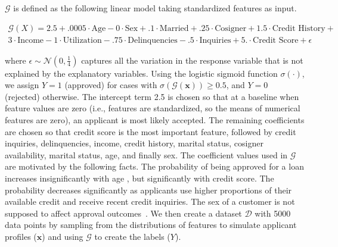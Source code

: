 \documentclass[mnsc,blindrev]{informs3}
\begin{document}
    $\mathcal{G}$ is defined as the following linear model taking standardized features as input. 
    \begin{tcolorbox}%
    \begin{equation}
    \label{eqn:gt}
    \begin{split}
    \mathcal{G}(X) =2.5 +.0005\cdot\text{Age} -0\cdot\text{Sex} +.1 \cdot \text{Married} + .25\cdot \text{Cosigner} + 1.5 \cdot \text{Credit History} + \\   3 \cdot \text{Income} - 1\cdot\text{Utilization} -.75 \cdot \text{Delinquencies} - .5\cdot\text{Inquiries} + 5.\cdot\text{Credit Score} + \epsilon
    \end{split}
    \end{equation}
    \end{tcolorbox}
    \noindent where $\epsilon \sim \mathcal{N}(0,\frac{1}{4})$ captures all the variation in the response variable that is not explained by the explanatory variables.
    Using the logistic sigmoid function $\sigma(\cdot)$, we assign $Y = 1$ (approved) for cases with $\sigma(\mathcal{G}(\mathbf{x}))\geq 0.5$, and $Y = 0$ (rejected) otherwise. The intercept term 2.5 is chosen so that at a baseline when feature values are zero (i.e., features are standardized, so the means of numerical features are zero), an applicant is most likely accepted. The remaining coefficients are chosen so that credit score is the most important feature, followed by credit inquiries, delinquencies, income, credit history, marital status, cosigner availability, marital status, age, and finally sex. The coefficient values used in $\mathcal{G}$ are motivated by the following facts. The probability of being approved for a loan increases insignificantly with age \citep{cfb_age}, but significantly with credit score. The probability decreases significantly as applicants use higher proportions of their available credit and receive recent credit inquiries. The sex of a customer is not supposed to affect approval outcomes~\citep{Calcagnini2014}. 
   We then create a dataset $\mathcal{D}$ with 5000 data points by sampling from the distributions of features to simulate applicant profiles ($\mathbf{x}$) and using $\mathcal{G}$ to create the labels ($Y$). 
\end{document}

